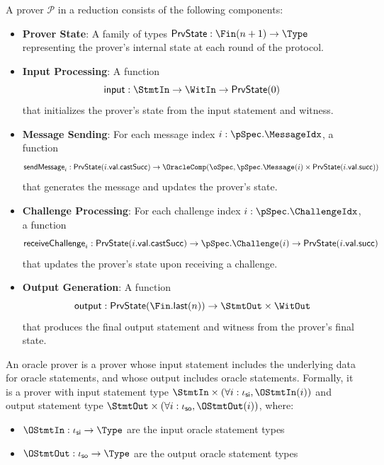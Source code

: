 \begin{definition}
    \label{def:prover}
    A prover $\mathcal{P}$ in a reduction consists of the following components:

    \begin{itemize}
        \item \textbf{Prover State}: A family of types $\mathsf{PrvState} : \Fin(n+1) \to \Type$ representing the prover's internal state at each round of the protocol.

        \item \textbf{Input Processing}: A function
        \[ \mathsf{input} : \StmtIn \to \WitIn \to \mathsf{PrvState}(0) \]
        that initializes the prover's state from the input statement and witness.

        \item \textbf{Message Sending}: For each message index $i : \pSpec.\MessageIdx$, a function
        \[ \mathsf{sendMessage}_i : \mathsf{PrvState}(i.\mathsf{val}.\mathsf{castSucc}) \to \OracleComp(\oSpec, \pSpec.\Message(i) \times \mathsf{PrvState}(i.\mathsf{val}.\mathsf{succ})) \]
        that generates the message and updates the prover's state.

        \item \textbf{Challenge Processing}: For each challenge index $i : \pSpec.\ChallengeIdx$, a function
        \[ \mathsf{receiveChallenge}_i : \mathsf{PrvState}(i.\mathsf{val}.\mathsf{castSucc}) \to \pSpec.\Challenge(i) \to \mathsf{PrvState}(i.\mathsf{val}.\mathsf{succ}) \]
        that updates the prover's state upon receiving a challenge.

        \item \textbf{Output Generation}: A function
        \[ \mathsf{output} : \mathsf{PrvState}(\Fin.\mathsf{last}(n)) \to \StmtOut \times \WitOut \]
        that produces the final output statement and witness from the prover's final state.
    \end{itemize}
\end{definition}

\begin{definition}
    \label{def:oracle_prover}
    An oracle prover is a prover whose input statement includes the underlying data for oracle statements, and whose output includes oracle statements. Formally, it is a prover with input statement type $\StmtIn \times (\forall i : \iota_{\mathsf{si}}, \OStmtIn(i))$ and output statement type $\StmtOut \times (\forall i : \iota_{\mathsf{so}}, \OStmtOut(i))$, where:
    \begin{itemize}
        \item $\OStmtIn : \iota_{\mathsf{si}} \to \Type$ are the input oracle statement types
        \item $\OStmtOut : \iota_{\mathsf{so}} \to \Type$ are the output oracle statement types
    \end{itemize}
\end{definition}

